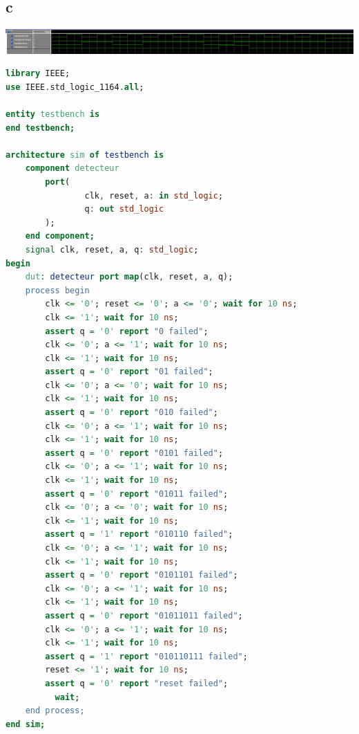 \documentclass{article}
\begin{document}
\subsection*{c}
\includegraphics*[width=\textwidth]{q2c}
\pagebreak
\begin{lstlisting}[language=VHDL]
library IEEE;
use IEEE.std_logic_1164.all;

entity testbench is 
end testbench;

architecture sim of testbench is
    component detecteur
        port(
                clk, reset, a: in std_logic;
                q: out std_logic
        );
    end component;
    signal clk, reset, a, q: std_logic;
begin
    dut: detecteur port map(clk, reset, a, q);
    process begin
        clk <= '0'; reset <= '0'; a <= '0'; wait for 10 ns;
        clk <= '1'; wait for 10 ns;
        assert q = '0' report "0 failed";
        clk <= '0'; a <= '1'; wait for 10 ns;
        clk <= '1'; wait for 10 ns;
        assert q = '0' report "01 failed";
        clk <= '0'; a <= '0'; wait for 10 ns;
        clk <= '1'; wait for 10 ns;
        assert q = '0' report "010 failed";
        clk <= '0'; a <= '1'; wait for 10 ns;
        clk <= '1'; wait for 10 ns;
        assert q = '0' report "0101 failed";
        clk <= '0'; a <= '1'; wait for 10 ns;
        clk <= '1'; wait for 10 ns;
        assert q = '0' report "01011 failed";
        clk <= '0'; a <= '0'; wait for 10 ns;
        clk <= '1'; wait for 10 ns;
        assert q = '1' report "010110 failed";
        clk <= '0'; a <= '1'; wait for 10 ns;
        clk <= '1'; wait for 10 ns;
        assert q = '0' report "0101101 failed";
        clk <= '0'; a <= '1'; wait for 10 ns;
        clk <= '1'; wait for 10 ns;
        assert q = '0' report "01011011 failed";
        clk <= '0'; a <= '1'; wait for 10 ns;
        clk <= '1'; wait for 10 ns;
        assert q = '1' report "010110111 failed";
        reset <= '1'; wait for 10 ns;
        assert q = '0' report "reset failed";
		  wait;
    end process;
end sim;
\end{lstlisting}
\end{document}
